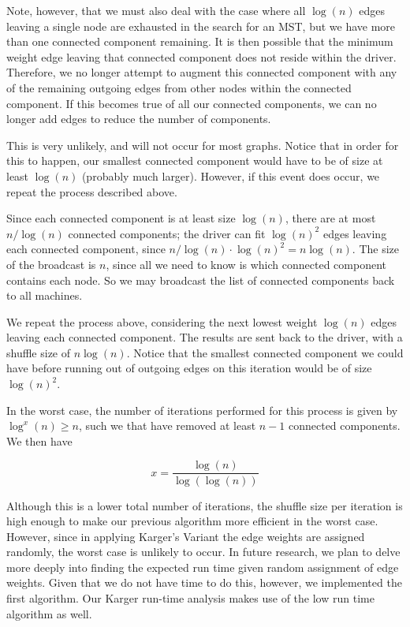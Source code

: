 \documentclass[12pt]{article}
\begin{document}
Note, however, that we must also deal with the case where all $\log(n)$ edges leaving a single node are exhausted in the search for an MST, but we have more than one connected component remaining. It is then possible that the minimum weight edge leaving that connected component does not reside within the driver. Therefore, we no longer attempt to augment this connected component with any of the remaining outgoing edges from other nodes within the connected component. If this becomes true of all our connected components, we can no longer add edges to reduce the number of components. 

This is very unlikely, and will not occur for most graphs. Notice that in order for this to happen, our smallest connected component would have to be of size at least $\log(n)$ (probably much larger). However, if this event does occur, we repeat the process described above. 

Since each connected component is at least size $\log(n)$, there are at most $n/ \log(n)$ connected components; the driver can fit $\log(n)^2$ edges leaving each connected component, since $n/\log(n) \cdot \log(n)^2 = n \log(n)$. The size of the broadcast is $n$, since all we need to know is which connected component contains each node. So we may broadcast the list of connected components back to all machines. 

We repeat the process above, considering the next lowest weight $\log(n)$ edges leaving each connected component. The results are sent back to the driver, with a shuffle size of $n \log (n)$. Notice that the smallest connected component we could have before running out of outgoing edges on this iteration would be of size $\log(n)^2$. 

In the worst case, the number of iterations performed for this process is given by $\log^x(n) \geq n$, such we that have removed at least $n-1$ connected components. We then have

\[
x = \frac{\log(n)}{\log(\log(n))}
\]

Although this is a lower total number of iterations, the shuffle size per iteration is high enough to make our previous algorithm more efficient in the worst case. However, since in applying Karger's Variant the edge weights are assigned randomly, the worst case is unlikely to occur. In future research, we plan to delve more deeply into finding the expected run time given random assignment of edge weights. Given that we do not have time to do this, however, we implemented the first algorithm. Our Karger run-time analysis makes use of the low run time algorithm as well.
\end{document}
